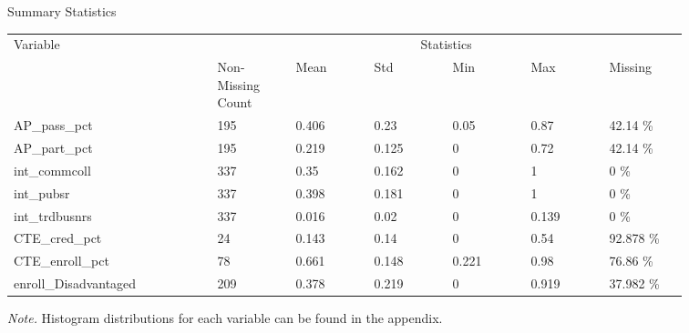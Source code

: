 \begin{threeparttable}
    \renewcommand\thetable{2}
    \caption{Summary Statistics} %
\label{tab:summarystats1} %
    \begin{tabular}{ p{0.26\linewidth} p{0.1\linewidth} p{0.1\linewidth} p{0.1\linewidth} p{0.1\linewidth} p{0.1\linewidth} p{0.1\linewidth}}     %
    \toprule %
    Variable                        & \multicolumn{6}{c}{Statistics} \\ %

                       \cmidrule(r){2-7} %
                                    &   Non-Missing Count   &   Mean & Std & Min & Max & Missing  \\ 
\midrule 

 AP\_pass\_pct  &  195  &  0.406  & 0.23    & 0.05 & 0.87  & 42.14 \%  \\ 
 AP\_part\_pct  &  195  &  0.219  & 0.125   & 0    & 0.72  & 42.14 \%  \\ 
 int\_commcoll  &  337  &  0.35   & 0.162   & 0    & 1     & 0 \%  \\ 
 int\_pubsr     &  337  &  0.398  & 0.181   & 0    & 1     & 0 \%  \\ 
 int\_trdbusnrs &  337  &  0.016  & 0.02    & 0    & 0.139 & 0 \%  \\
 CTE\_cred\_pct &  24   &  0.143  & 0.14    & 0    & 0.54  & 92.878 \%\\
 CTE\_enroll\_pct& 78 & 0.661 & 0.148 & 0.221 & 0.98 & 76.86 \% \\
 enroll\_Disadvantaged & 209 & 0.378 & 0.219 & 0 & 0.919 & 37.982 \% \\
\midrule
\end{tabular}
\begin{tablenotes}
    \textit{Note.} Histogram distributions for each variable can be found in the appendix.
\end{tablenotes}

\end{threeparttable}